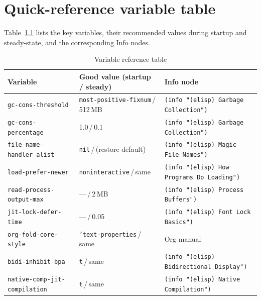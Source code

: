 \chapter{Quick-reference variable table}
\label{app:variable-table}

\noindent
Table~\ref{tab:variable-reference} lists the key variables, their recommended values during startup and steady-state, and the corresponding Info nodes.

\begin{table}
\centering
\caption{Variable reference table}
\label{tab:variable-reference}
\begin{tabularx}{\linewidth}{@{}llX@{}}
\toprule
Variable & Good value (startup / steady) & Info node \\
\midrule
\texttt{gc-cons-threshold} & \texttt{most-positive-fixnum}\,/\,512\,MB & \texttt{(info "(elisp) Garbage Collection")} \\
\texttt{gc-cons-percentage} & 1.0\,/\,0.1 & \texttt{(info "(elisp) Garbage Collection")} \\
\texttt{file-name-handler-alist} & \texttt{nil}\,/\,(restore default) & \texttt{(info "(elisp) Magic File Names")} \\
\texttt{load-prefer-newer} & \texttt{noninteractive}\,/\,same & \texttt{(info "(elisp) How Programs Do Loading")} \\
\texttt{read-process-output-max} & ---\,/\,2\,MB & \texttt{(info "(elisp) Process Buffers")} \\
\texttt{jit-lock-defer-time} & ---\,/\,0.05 & \texttt{(info "(elisp) Font Lock Basics")} \\
\texttt{org-fold-core-style} & \texttt{'text-properties}\,/\,same & Org manual \\
\texttt{bidi-inhibit-bpa} & \texttt{t}\,/\,same & \texttt{(info "(elisp) Bidirectional Display")} \\
\texttt{native-comp-jit-compilation} & \texttt{t}\,/\,same & \texttt{(info "(elisp) Native Compilation")} \\
\bottomrule
\end{tabularx}
\end{table}
